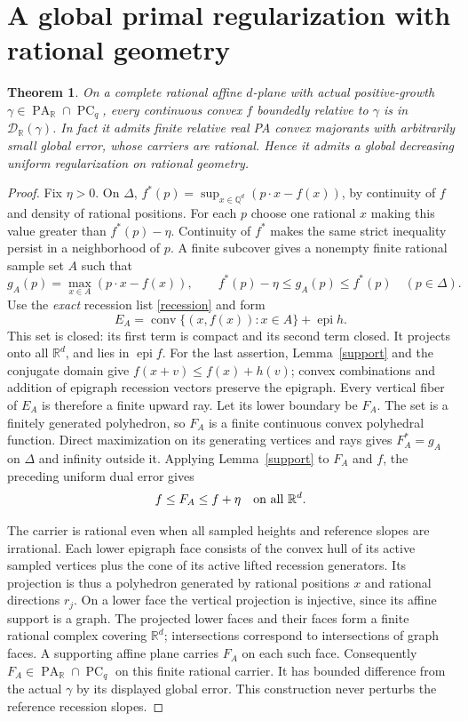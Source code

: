 \documentclass[11pt]{article}
\newtheorem{theorem}{Theorem}
\newcommand{\R}{\mathbb R}
\newcommand{\Q}{\mathbb Q}
\newcommand{\PC}{\operatorname{PC}_q}
\newcommand{\PA}{\operatorname{PA}}
\newcommand{\D}{\mathcal D_\R(\gamma)}
\begin{document}
\section{A global primal regularization with rational geometry}
\begin{theorem}\label{affinedensity}
On a complete rational affine $d$-plane with actual positive-growth
$\gamma\in\PA_\R\cap\PC$, every continuous convex $f$ boundedly
relative to $\gamma$ is in $\D$. In fact it admits finite relative
real PA convex majorants with arbitrarily small global error, whose
carriers are rational. Hence it admits a global decreasing uniform
regularization on rational geometry.
\end{theorem}
\begin{proof}
Fix $\eta>0$. On $\Delta$, $f^*(p)=\sup_{x\in\Q^d}
(p\cdot x-f(x))$, by continuity of $f$ and density of rational
positions. For each $p$ choose one rational $x$ making this value
greater than $f^*(p)-\eta$. Continuity of $f^*$ makes the same strict
inequality persist in a neighborhood of $p$. A finite subcover gives
a nonempty finite rational sample set $A$ such that
\[
 g_A(p)=\max_{x\in A}(p\cdot x-f(x)),\qquad
 f^*(p)-\eta\leq g_A(p)\leq f^*(p)\quad(p\in\Delta).
\]
Use the \emph{exact} recession list \eqref{recession} and form
\[
 E_A=\operatorname{conv}\{(x,f(x)):x\in A\}
       +\operatorname{epi}h.
\]
This set is closed: its first term is compact and its second term
closed. It projects onto all $\R^d$, and lies in $\operatorname{epi}f$.
For the last assertion, Lemma~\ref{support} and the conjugate domain
give $f(x+v)\leq f(x)+h(v)$; convex combinations and addition of
epigraph recession vectors preserve the epigraph. Every vertical
fiber of $E_A$ is therefore a finite upward ray. Let its lower
boundary be $F_A$. The set is a finitely generated polyhedron, so
$F_A$ is a finite continuous convex polyhedral function. Direct
maximization on its generating vertices and rays gives
$F_A^*=g_A$ on $\Delta$ and infinity outside it. Applying
Lemma~\ref{support} to $F_A$ and $f$, the preceding uniform dual
error gives
\[
                  f\leq F_A\leq f+\eta\quad\hbox{on all }\R^d.
\]

The carrier is rational even when all sampled heights and reference
slopes are irrational. Each lower epigraph face consists of the convex
hull of its active sampled vertices plus the cone of its active lifted
recession generators. Its projection is thus a polyhedron generated
by rational positions $x$ and rational directions $r_j$. On a lower
face the vertical projection is injective, since its affine support
is a graph. The projected lower faces and their faces form a finite
rational complex covering $\R^d$; intersections correspond to
intersections of graph faces. A supporting affine plane carries $F_A$
on each such face. Consequently $F_A\in\PA_\R\cap\PC$ on this
finite rational carrier. It has bounded difference from the actual
$\gamma$ by its displayed global error. This construction never
perturbs the reference recession slopes.


\end{proof}
\end{document}
